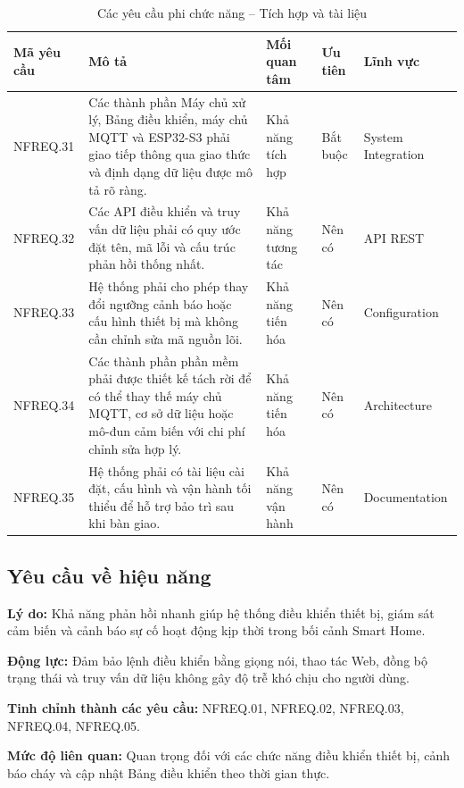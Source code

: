 \documentclass[a4paper,12pt]{article}
\begin{document}
\begin{table}[H]
\centering
\caption{Các yêu cầu phi chức năng -- Tích hợp và tài liệu}
\small
\begin{tabularx}{\linewidth}{|p{1.8cm}|X|p{2.5cm}|p{1.7cm}|p{2.1cm}|}
\hline
\textbf{Mã yêu cầu} & \textbf{Mô tả} & \textbf{Mối quan tâm} & \textbf{Ưu tiên} & \textbf{Lĩnh vực}\\
\hline
NFREQ.31 & Các thành phần Máy chủ xử lý, Bảng điều khiển, máy chủ MQTT và ESP32-S3 phải giao tiếp thông qua giao thức và định dạng dữ liệu được mô tả rõ ràng. & Khả năng tích hợp & Bắt buộc & System Integration\\
\hline
NFREQ.32 & Các API điều khiển và truy vấn dữ liệu phải có quy ước đặt tên, mã lỗi và cấu trúc phản hồi thống nhất. & Khả năng tương tác & Nên có & API REST\\
\hline
NFREQ.33 & Hệ thống phải cho phép thay đổi ngưỡng cảnh báo hoặc cấu hình thiết bị mà không cần chỉnh sửa mã nguồn lõi. & Khả năng tiến hóa & Nên có & Configuration\\
\hline
NFREQ.34 & Các thành phần phần mềm phải được thiết kế tách rời để có thể thay thế máy chủ MQTT, cơ sở dữ liệu hoặc mô-đun cảm biến với chi phí chỉnh sửa hợp lý. & Khả năng tiến hóa & Nên có & Architecture\\
\hline
NFREQ.35 & Hệ thống phải có tài liệu cài đặt, cấu hình và vận hành tối thiểu để hỗ trợ bảo trì sau khi bàn giao. & Khả năng vận hành & Nên có & Documentation\\
\hline
\end{tabularx}
\end{table}
\subsection{Yêu cầu về hiệu năng}

\textbf{Lý do:} Khả năng phản hồi nhanh giúp hệ thống điều khiển thiết bị, giám sát cảm biến và cảnh báo sự cố hoạt động kịp thời trong bối cảnh Smart Home.

\textbf{Động lực:} Đảm bảo lệnh điều khiển bằng giọng nói, thao tác Web, đồng bộ trạng thái và truy vấn dữ liệu không gây độ trễ khó chịu cho người dùng.

\textbf{Tinh chỉnh thành các yêu cầu:} NFREQ.01, NFREQ.02, NFREQ.03, NFREQ.04, NFREQ.05.

\textbf{Mức độ liên quan:} Quan trọng đối với các chức năng điều khiển thiết bị, cảnh báo cháy và cập nhật Bảng điều khiển theo thời gian thực.
\end{document}
